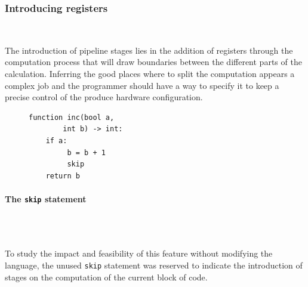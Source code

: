 \documentclass[10pt,a4paper]{article}
\renewcommand{\indent}{~\\\vspace{-.8cm}}
\newcommand{\pindent}{~\\\indent}
\newcommand{\whileyLine}{\lstinline[language=Whiley,basicstyle=\normalsize\ttfamily]}
\begin{document}
\subsubsection{Introducing registers}
\indent


The introduction of pipeline stages  lies in the addition of registers through the computation process that will draw boundaries between the different parts of the calculation. Inferring the good places where to split the computation appears a complex job and the programmer should have a way to specify it to keep a precise control of the produce hardware configuration. 

\begin{figure}
\vspace{-20pt}
\begin{lstlisting}[language=Whiley, frame=single, showlines=true]
function inc(bool a,
        int b) -> int:
    if a:
         b = b + 1
         skip
    return b
\end{lstlisting}
\end{figure}

\paragraph{The \whileyLine{skip} statement} \pindent


To study the impact and feasibility of this feature without modifying the language, the unused \whileyLine{skip} statement was reserved to indicate the introduction of stages on the computation of the current block of code.\\
\end{document}
